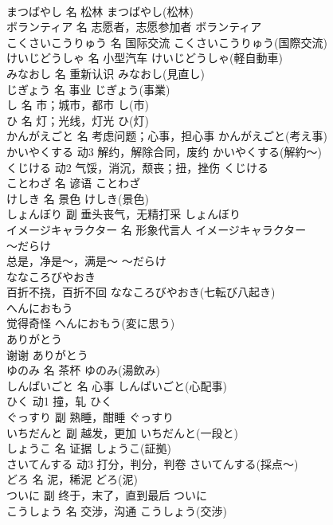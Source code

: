 \documentclass[8pt]{extreport}
\begin{document}
\begin{CJK}{UTF8}{min}
\\	まつばやし	名	松林	まつばやし(松林)	
\\	ボランティア	名	志愿者，志愿参加者	ボランティア	
\\	こくさいこうりゅう	名	国际交流	こくさいこうりゅう(国際交流)	
\\	けいじどうしゃ	名	小型汽车	けいじどうしゃ(軽自動車)	
\\	みなおし	名	重新认识	みなおし(見直し)	
\\	じぎょう	名	事业	じぎょう(事業)	
\\	し	名	市；城市，都市	し(市)	
\\	ひ	名	灯；光线，灯光	ひ(灯)	
\\	かんがえごと	名	考虑问题；心事，担心事	かんがえごと(考え事)	
\\	かいやくする	动3	解约，解除合同，废约	かいやくする(解約～)	
\\	くじける	动2	气馁，消沉，颓丧；扭，挫伤	くじける	
\\	ことわざ	名	谚语	ことわざ	
\\	けしき	名	景色	けしき(景色)	
\\	しょんぼり	副	垂头丧气，无精打采	しょんぼり	
\\	イメージキャラクター	名	形象代言人	イメージキャラクター	
\\	～だらけ	
\\	总是，净是～，满是～	～だらけ	
\\	ななころびやおき	
\\	百折不挠，百折不回	ななころびやおき(七転び八起き)	
\\	へんにおもう	
\\	觉得奇怪	へんにおもう(変に思う)	
\\	ありがとう	
\\	谢谢	ありがとう	
\\	ゆのみ	名	茶杯	ゆのみ(湯飲み)	
\\	しんぱいごと	名	心事	しんぱいごと(心配事)	
\\	ひく	动1	撞，轧	ひく	
\\	ぐっすり	副	熟睡，酣睡	ぐっすり	
\\	いちだんと	副	越发，更加	いちだんと(一段と)	
\\	しょうこ	名	证据	しょうこ(証拠)	
\\	さいてんする	动3	打分，判分，判卷	さいてんする(採点～)	
\\	どろ	名	泥，稀泥	どろ(泥)	
\\	ついに	副	终于，末了，直到最后	ついに	
\\	こうしょう	名	交涉，沟通	こうしょう(交渉)	

\end{CJK}
\end{document}
